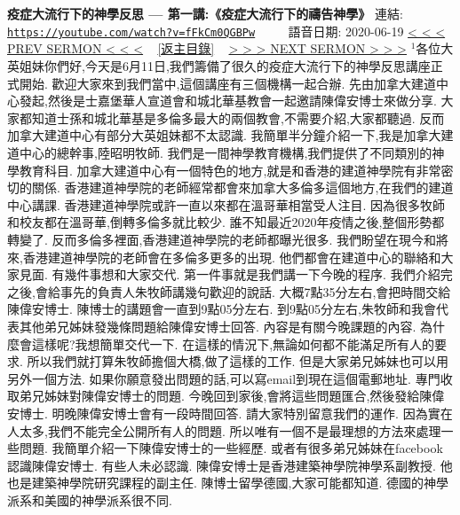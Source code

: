 \documentclass{book}
\begin{document}
\section{}
\label{sec:fFkCm0QGBPw}
\textbf{疫症大流行下的神學反思 --- 第一講:《疫症大流行下的禱告神學》}
\newline
\newline
連結: \href{https://youtube.com/watch?v=fFkCm0QGBPw}{\texttt{https://youtube.com/watch?v=fFkCm0QGBPw}} ~~~~ 語音日期: 2020-06-19
\newline
\newline
\hyperref[sec:qcKLit3iF4o]{\small{< < < PREV SERMON < < <}}
~
\hyperref[sec:index]{\small{[返主目錄]}}
~
\hyperref[sec:yb30yQHiYdM]{\small{> > > NEXT SERMON > > >}}
\newline
\newline
$^{1}$各位大英姐妹你們好,今天是6月11日,我們籌備了很久的疫症大流行下的神學反思講座正式開始.
歡迎大家來到我們當中,這個講座有三個機構一起合辦.
先由加拿大建道中心發起,然後是士嘉堡華人宣道會和城北華基教會一起邀請陳偉安博士來做分享.
大家都知道士孫和城北華基是多倫多最大的兩個教會,不需要介紹,大家都聽過.
反而加拿大建道中心有部分大英姐妹都不太認識.
我簡單半分鐘介紹一下,我是加拿大建道中心的總幹事,陸昭明牧師.
我們是一間神學教育機構,我們提供了不同類別的神學教育科目.
加拿大建道中心有一個特色的地方,就是和香港的建道神學院有非常密切的關係.
香港建道神學院的老師經常都會來加拿大多倫多這個地方,在我們的建道中心講課.
香港建道神學院或許一直以來都在溫哥華相當受人注目.
因為很多牧師和校友都在溫哥華,倒轉多倫多就比較少.
誰不知最近2020年疫情之後,整個形勢都轉變了.
反而多倫多裡面,香港建道神學院的老師都曝光很多.
我們盼望在現今和將來,香港建道神學院的老師會在多倫多更多的出現.
他們都會在建道中心的聯絡和大家見面.
有幾件事想和大家交代.
第一件事就是我們講一下今晚的程序.
我們介紹完之後,會給事先的負責人朱牧師講幾句歡迎的說話.
大概7點35分左右,會把時間交給陳偉安博士.
陳博士的講題會一直到9點05分左右.
到9點05分左右,朱牧師和我會代表其他弟兄姊妹發幾條問題給陳偉安博士回答.
內容是有關今晚課題的內容.
為什麼會這樣呢?我想簡單交代一下.
在這樣的情況下,無論如何都不能滿足所有人的要求.
所以我們就打算朱牧師擔個大橋,做了這樣的工作.
但是大家弟兄姊妹也可以用另外一個方法.
如果你願意發出問題的話,可以寫email到現在這個電郵地址.
專門收取弟兄姊妹對陳偉安博士的問題.
今晚回到家後,會將這些問題匯合,然後發給陳偉安博士.
明晚陳偉安博士會有一段時間回答.
請大家特別留意我們的運作.
因為實在人太多,我們不能完全公開所有人的問題.
所以唯有一個不是最理想的方法來處理一些問題.
我簡單介紹一下陳偉安博士的一些經歷.
或者有很多弟兄姊妹在facebook認識陳偉安博士.
有些人未必認識.
陳偉安博士是香港建築神學院神學系副教授.
他也是建築神學院研究課程的副主任.
陳博士留學德國,大家可能都知道.
德國的神學派系和美國的神學派系很不同.
\end{document}
